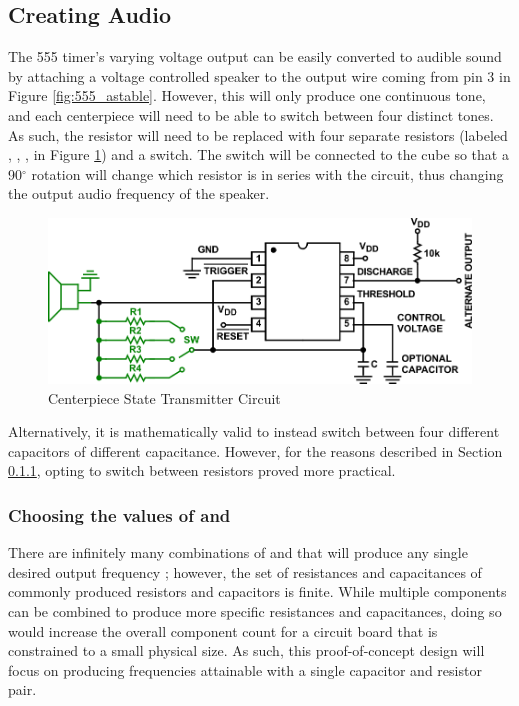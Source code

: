 \subsection{Creating Audio}
The 555 timer's varying voltage output can be easily converted to audible sound  by attaching a voltage controlled speaker to the output wire coming from pin 3 in Figure \ref{fig:555_astable}.
However, this will only produce one continuous tone, and each centerpiece will need to be able to switch between four distinct tones.
As such, the resistor  will need to be replaced with four separate resistors (labeled , , ,  in Figure \ref{fig:555_astable_modded}) and a switch.
The switch will be connected to the cube so that a 90$^\circ$ rotation will change which resistor is in series with the circuit, thus changing the output audio frequency of the speaker.
\begin{figure}[h]
    \centering
    \caption{Centerpiece State Transmitter Circuit}
    \label{fig:555_astable_modded}
    \includegraphics[width=\linewidth]{Figures/6 PCB Design/555_astable_modded.png}
\end{figure}

Alternatively, it is mathematically valid to instead switch between four different capacitors of different capacitance.
However, for the reasons described in Section \ref{subsubsec:freq_selection}, opting to switch between resistors proved more practical.

\subsubsection{Choosing the values of  and }
\label{subsubsec:freq_selection}
There are infinitely many combinations of  and  that will produce any single desired output frequency ; however, the set of resistances and capacitances of commonly produced resistors and capacitors is finite.
While multiple components can be combined to produce more specific resistances and capacitances, doing so would increase the overall component count for a circuit board that is constrained to a small physical size.
As such, this proof-of-concept design will focus on producing frequencies attainable with a single capacitor and resistor pair.

